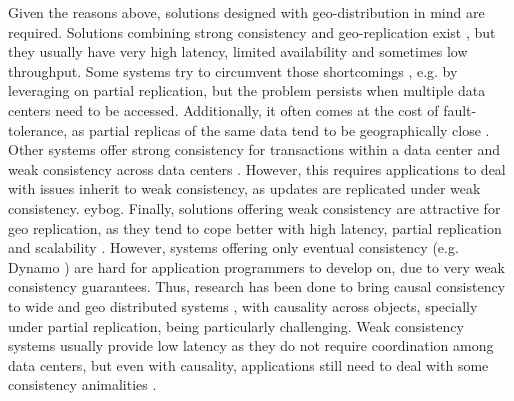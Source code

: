 Given the reasons above, solutions designed with geo-distribution in mind are required.
Solutions combining strong consistency and geo-replication exist \cite{mdcc, slog, scatter}, but they usually have very high latency, limited availability and sometimes low throughput.
Some systems try to circumvent those shortcomings \cite{mdcc, chronocache, slog, walter, caerus, detock}, e.g. by leveraging on partial replication, but the problem persists when multiple data centers need to be accessed.
Additionally, it often comes at the cost of fault-tolerance, as partial replicas of the same data tend to be geographically close \cite{caerus, detock, slog, cockroachdb}.
Other systems offer strong consistency for transactions within a data center and weak consistency across data centers \cite{cops, eiger, walter}.
However, this requires applications to deal with issues inherit to weak consistency, as updates are replicated under weak consistency.
eybog.
Finally, solutions offering weak consistency are attractive for geo replication, as they tend to cope better with high latency, partial replication and scalability \cite{eiger, cure, walter, dynamo}.
However, systems offering only eventual consistency (e.g. Dynamo \cite{dynamo}) are hard for application programmers to develop on, due to very weak consistency guarantees.
Thus, research has been done to bring causal consistency to wide and geo distributed systems \cite{cops, eiger, saturn, cure, walter, chainreaction}, with causality across objects, specially under partial replication, being particularly challenging.
Weak consistency systems usually provide low latency as they do not require coordination among data centers, but even with causality, applications still need to deal with some consistency animalities \cite{sconekv, epoch}.

